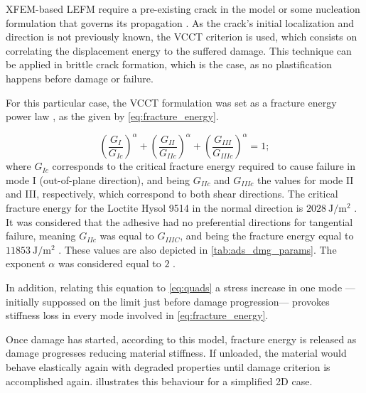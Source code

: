 \documentclass[cmfonts]{witpress}
\begin{document}
XFEM-based LEFM require a pre-existing crack in the model or some nucleation formulation that governs its propagation \cite{Abaqus613Manual}. As the crack's initial localization and direction is not previously known, the VCCT criterion is used, which consists on correlating the displacement energy to the suffered damage. This technique can be applied in brittle crack formation, which is the case, as no plastification happens before damage or failure.

For this particular case, the VCCT formulation was set as a fracture energy power law \cite{Loureiro2010, Sadowski2010, Sadowski2011, Sadowski2014, SernaMoreno2015}, as the given by \cref{eq:fracture_energy}.

\begin{equation}
\left(\frac{G_{I}}{G_{Ic}}\right)^{\alpha}+\left(\frac{G_{II}}{G_{IIc}}\right)^{\alpha}+\left(\frac{G_{III}}{G_{IIIc}}\right)^{\alpha}=1 ;
\label{eq:fracture_energy}
\end{equation}
where $G_{Ic}$ corresponds to the critical fracture energy required to cause failure in mode I (out-of-plane direction), and being $G_{IIc}$ and $G_{IIIc}$ the values for mode II and III, respectively, which correspond to both shear directions. The critical fracture energy for the Loctite Hysol 9514 in the normal direction is $\SI{2028}{\J/\m^2}$ \cite{Scattina2011}. It was considered that the adhesive had no preferential directions for tangential failure, meaning $G_{IIc}$ was equal to $G_{IIIC}$, and being the fracture energy equal to $\SI{11853}{\J/\m^2}$ \cite{Scattina2011}. These values are also depicted in \cref{tab:ads_dmg_params}. The exponent $\alpha$ was considered equal to $\num{2}$ \cite{Loureiro2010, Sadowski2010, Sadowski2011, Sadowski2014, SernaMoreno2015}.

In addition, relating this equation to \cref{eq:quads} a stress increase in one mode ---initially suppossed on the limit just before damage progression--- provokes stiffness loss in every mode involved in \cref{eq:fracture_energy}.

Once damage has started, according to this model, fracture energy is released as damage progresses reducing material stiffness. If unloaded, the material would behave elastically again with degraded properties until damage criterion is accomplished again.  illustrates this behaviour for a simplified 2D case.
\end{document}

